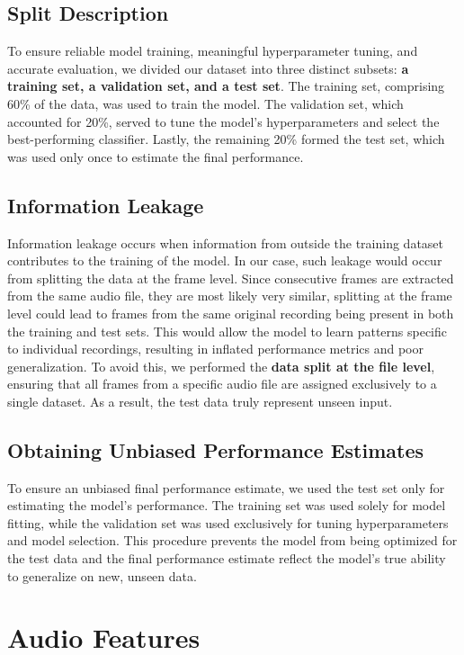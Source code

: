 \documentclass{article}
\begin{document}
\subsection{Split Description}
To ensure reliable model training, meaningful hyperparameter tuning, and accurate evaluation, we divided our dataset into three distinct subsets: \textbf{a training set, a validation set, and a test set}. The training set, comprising 60\% of the data, was used to train the model. The validation set, which accounted for 20\%, served to tune the model’s hyperparameters and select the best-performing classifier. Lastly, the remaining 20\% formed the test set, which was used only once to estimate the final performance. 

\subsection{Information Leakage}
Information leakage occurs when information from outside the training dataset contributes to the training of the model. In our case, such leakage would occur from splitting the data at the frame level. Since consecutive frames are extracted from the same audio file, they are most likely very similar, splitting at the frame level could lead to frames from the same original recording being present in both the training and test sets. This would allow the model to learn patterns specific to individual recordings, resulting in inflated performance metrics and poor generalization. To avoid this, we performed the \textbf{data split at the file level}, ensuring that all frames from a specific audio file are assigned exclusively to a single dataset. As a result, the test data truly represent unseen input.  

\subsection{Obtaining Unbiased Performance Estimates}
To ensure an unbiased final performance estimate, we used the test set only for estimating the model’s performance. The training set was used solely for model fitting, while the validation set was used exclusively for tuning hyperparameters and model selection. This procedure prevents the model from being optimized for the test data and the final performance estimate reflect the model’s true ability to generalize on new, unseen data.


\section{Audio Features}
\end{document}
